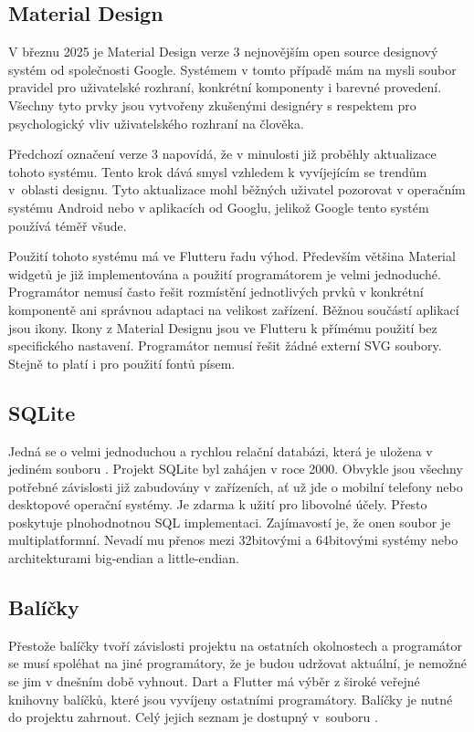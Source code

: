 \documentclass[
  biblatex,
  figures=true,
  tables=false,
  glossaries,
  index
]{kidiplom}
\begin{document}
\subsection{Material Design} \label{Material Design}
V březnu 2025 je Material Design verze 3 \cite{m3} nejnovějším open source designový systém od společnosti Google. Systémem v tomto případě mám na mysli soubor pravidel pro uživatelské rozhraní, konkrétní komponenty i barevné provedení. Všechny tyto prvky jsou vytvořeny zkušenými designéry s respektem pro psychologický vliv uživatelského rozhraní na člověka.

Předchozí označení verze 3 napovídá, že v minulosti již proběhly aktualizace tohoto systému. Tento krok dává smysl vzhledem k vyvíjejícím se trendům v~oblasti designu. Tyto aktualizace mohl běžných uživatel pozorovat v operačním systému Android nebo v aplikacích od Googlu, jelikož Google tento systém používá téměř všude.

Použití tohoto systému má ve Flutteru řadu výhod. Především většina Material widgetů je již implementována \cite{m3-components} a použití programátorem je velmi jednoduché. Programátor nemusí často řešit rozmístění jednotlivých prvků v konkrétní komponentě ani správnou adaptaci na velikost zařízení. Běžnou součástí aplikací jsou ikony. Ikony z Material Designu jsou ve Flutteru k přímému použití bez specifického nastavení. Programátor nemusí řešit žádné externí SVG soubory. Stejně to platí i pro použití fontů písem.

\subsection{SQLite}
Jedná se o velmi jednoduchou a rychlou relační databázi, která je uložena v jediném souboru \cite{sqlite}. Projekt SQLite byl zahájen v roce 2000. Obvykle jsou všechny potřebné závislosti již zabudovány v zařízeních, ať už jde o mobilní telefony nebo desktopové operační systémy. Je zdarma k užití pro libovolné účely. Přesto poskytuje plnohodnotnou SQL implementaci. Zajímavostí je, že onen soubor je multiplatformní. Nevadí mu přenos mezi 32bitovými a 64bitovými systémy nebo architekturami big-endian a little-endian.

\subsection{Balíčky}

Přestože balíčky tvoří závislosti projektu na ostatních okolnostech a programátor se musí spoléhat na jiné programátory, že je budou udržovat aktuální, je nemožné se jim v dnešním době vyhnout. Dart a Flutter má výběr z široké veřejné knihovny balíčků, které jsou vyvíjeny ostatními programátory. Balíčky je nutné do projektu zahrnout. Celý jejich seznam je dostupný v~souboru . 
\end{document}
